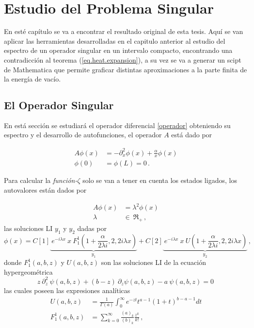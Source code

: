 \chapter{Estudio del Problema Singular}


En esté capítulo se va a encontrar el resultado original de esta tesis. Aquí se van aplicar las herramientas desarrolladas en el capitulo anterior al estudio del espectro de un operador singular en un intervalo compacto, encontrando una contradicción al teorema (\ref{eq.heat.expansion}), a su vez se va a generar un scipt de Mathematica que permite graficar distintas aproximaciones a la parte finita de la energía de vacío.

\section{El Operador Singular}


En está sección se estudiará el operador diferencial \ref{operador} obteniendo su espectro y el desarrollo de autofunciones, el operador $A$ está dado por

\begin{equation}
\begin{aligned}
    A \phi (x) &= - \partial ^2 _x  \phi(x) + \frac{\alpha}{x} \phi(x) \\[5pt]
    \phi(0) &= \phi(L) = 0 \, .
\end{aligned}
\label{operador}
\end{equation}

Para calcular la {\it función-$\zeta$} solo se van a tener en cuenta los estados ligados, los autovalores están dados por 

\begin{equation}
\begin{aligned}
    A  \phi (x)  &=   \lambda ^2 \phi (x) \\[5pt]
    \lambda \ &\in \ \mathfrak{R} _+ 
    \, ,
\end{aligned}
\label{eq.aut.sin}
\end{equation}
las soluciones LI $ y_1 $ y $ y_2 $ dadas por
\begin{equation}
    \phi (x) = 
    C[1]
    \underbrace{
     \ e ^{-i \lambda x} \ x \ F _{1} ^{1} (1+\frac{ \alpha}{2 \lambda i },2,2 i \lambda x) } _ {y_1}
    + C[2] \underbrace{ \ e^{-i \lambda x } \ x \ U (1+\frac{ \alpha}{2 \lambda i },2,2 i \lambda x) } _{y_2} 
    \, ,
\label{eq.phi}
\end{equation}
donde $F _1 ^1(a,b,z)$ y $ U(a,b,z)$ son las soluciones LI de la ecuación hypergeométrica
\begin{equation}
    z \ \partial ^2 _z \ \psi (a,b,z) + (b-z) \
    \partial _z \psi (a,b,z)
    -a \ \psi (a,b,z) = 0 \,
\end{equation}
las cuales poseen las expresiones analíticas 
\begin{equation}
\begin{aligned}
	U(a,b,z) &= \frac{1}{\Gamma (a)} 
	\int _0 ^{\infty} e ^{-zt}
	t ^{a-1}
	(1+t) ^{b-a-1}
	dt \\[5pt]
	F _1 ^1 (a,b,z) &= \sum _ {k=0} ^{\infty} 
	\frac{(a) _k}{(b) _k} 
	\frac{z ^k}{k!} 
	\, ,
\end{aligned}
\end{equation}


